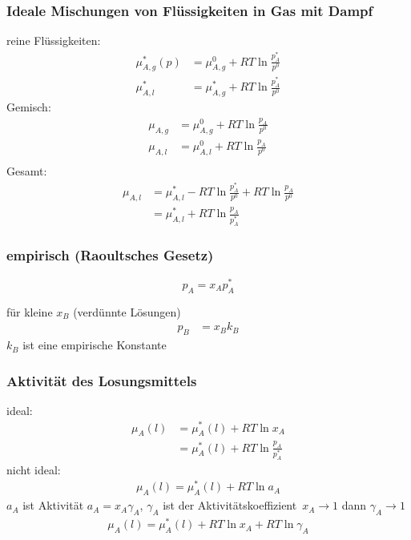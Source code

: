 \documentclass[a4paper, fleqn]{article}
\begin{document}
\subsubsection{Ideale Mischungen von Flüssigkeiten in Gas mit Dampf}
reine Flüssigkeiten:
\begin{align*}
    \mu_{A,g}^* (p) &= \mu_{A,g}^0 + RT \ln \frac{p_A^*}{p^0}\\
    \mu_{A,l}^* &= \mu_{A,g}^* + RT \ln \frac{p_A^*}{p^0}
\end{align*}
Gemisch:
\begin{align*}
    \mu_{A,g} &= \mu_{A,g}^0 + RT\ln \frac{p_A}{p^0}\\
    \mu_{A,l} &= \mu_{A,l}^0 + RT \ln \frac{p_A}{p^0}\\
\end{align*}
Gesamt:
\begin{align*}
    \mu_{A,l} &= \mu_{A,l}^* - RT \ln \frac{p_A^*}{p^0} + RT \ln \frac{p_A}{p^0}\\
    &= \mu_{A,l}^* + RT \ln \frac{p_A}{p_A^*}
\end{align*}

\subsubsection{empirisch (Raoultsches Gesetz)}
\begin{equation*}
    p_A = x_A p_A^*
\end{equation*}

für kleine $x_B$ (verdünnte Lösungen)\\
\begin{align*}
    p_B &= x_B k_B
\end{align*}
$k_B$ ist eine empirische Konstante

\subsubsection{Aktivität des Losungsmittels}
ideal:
\begin{align*}
    \mu_A (l) &= \mu_A^* (l) + RT \ln x_A\\
    &= \mu_A^* (l) +RT\ln \frac{p_A}{p_A^*}
\end{align*}
nicht ideal:
\begin{align*}
    \mu_A (l) = \mu_A^* (l) + RT \ln a_A
\end{align*}
$a_A$ ist Aktivität $a_A = x_A \gamma_A$, $\gamma_A$ ist der Aktivitätskoeffizient\
$x_A \rightarrow 1$ dann $\gamma_A \rightarrow 1$\\
\begin{align*}
    \mu_A (l) = \mu_A^*(l) + RT \ln x_A + RT\ln \gamma_A
\end{align*}
\end{document}
